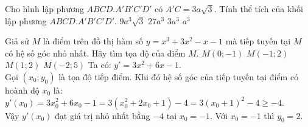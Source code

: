 \begin{ex}%
Cho hình lập phương $ABCD.A'B'C'D'$ có $A'C = 3a\sqrt{3}$. Tính thể tích của khối lập phương $ABCD.A'B'C'D'$.
 \choice
  { $9a^3 \sqrt{3}$}
  { \True $27a^3$}
  { $3a^3$}
  { $a^3$}
 \loigiai
  {
  {
  }
  }
\end{ex}


\begin{ex}%
Giả sử $M$ là điểm trên đồ thị hàm số $y = x^3+3x^2-x-1$ mà tiếp tuyến tại $M$ có hệ số góc nhỏ nhất. Hãy tìm tọa độ của điểm $M$.
 \choice
  { $M(0;-1)$}
  { \True $M(-1;2)$}
  { $M(1;2)$}
  { $M(-2;5)$}
 \loigiai
  {
  Ta có: $y' = 3x^2+6x-1$.\\
  Gọi $(x_0;y_0)$ là tọa độ tiếp điểm. Khi đó hệ số góc của tiếp tuyến tại điểm có hoành độ $x_0$ là:\\
  $y'(x_0) = 3x_0^2 + 6x_0 -1 = 3(x_0^2 + 2x_0+1)-4 = 3(x_0+1)^2-4 \ge -4$.\\
  Vậy $y'(x_0)$ đạt giá trị nhỏ nhất bằng $-4$ tại $x_0 = -1$. Với $x_0 = -1$ thì $y_0 = 2$.
  }
\end{ex}


